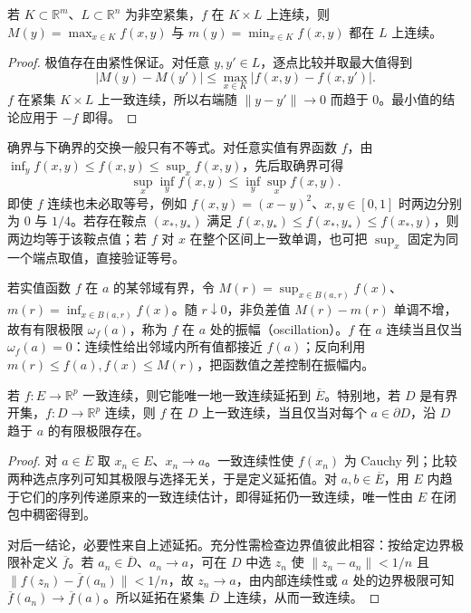 \begin{proposition}
\label{prop:pei-maximum-continuity}
若 $K\subset\mathbb R^m$、$L\subset\mathbb R^n$ 为非空紧集，$f$ 在 $K\times L$ 上连续，则 $M(y)=\max_{x\in K}f(x,y)$ 与 $m(y)=\min_{x\in K}f(x,y)$ 都在 $L$ 上连续。
\end{proposition}
\begin{proof}
极值存在由紧性保证。对任意 $y,y'\in L$，逐点比较并取最大值得到
\[
|M(y)-M(y')|\le\max_{x\in K}|f(x,y)-f(x,y')|.
\]
$f$ 在紧集 $K\times L$ 上一致连续，所以右端随 $\|y-y'\|\to0$ 而趋于 $0$。最小值的结论应用于 $-f$ 即得。
\end{proof}

确界与下确界的交换一般只有不等式。对任意实值有界函数 $f$，由 $\inf_y f(x,y)\le f(x,y)\le\sup_x f(x,y)$，先后取确界可得
\[
\sup_x\inf_y f(x,y)\le\inf_y\sup_x f(x,y).
\]
即使 $f$ 连续也未必取等号，例如 $f(x,y)=(x-y)^2$、$x,y\in[0,1]$ 时两边分别为 $0$ 与 $1/4$。若存在鞍点 $(x_*,y_*)$ 满足 $f(x,y_*)\le f(x_*,y_*)\le f(x_*,y)$，则两边均等于该鞍点值；若 $f$ 对 $x$ 在整个区间上一致单调，也可把 $\sup_x$ 固定为同一个端点取值，直接验证等号。

\begin{remark}
若实值函数 $f$ 在 $a$ 的某邻域有界，令 $M(r)=\sup_{x\in B(a,r)}f(x)$、$m(r)=\inf_{x\in B(a,r)}f(x)$。随 $r\downarrow0$，非负差值 $M(r)-m(r)$ 单调不增，故有有限极限 $\omega_f(a)$，称为 $f$ 在 $a$ 处的振幅（oscillation）。$f$ 在 $a$ 连续当且仅当 $\omega_f(a)=0$：连续性给出邻域内所有值都接近 $f(a)$；反向利用 $m(r)\le f(a),f(x)\le M(r)$，把函数值之差控制在振幅内。
\end{remark}

\begin{theorem}
\label{thm:pei-uniform-extension}
若 $f:E\to\mathbb R^p$ 一致连续，则它能唯一地一致连续延拓到 $\overline E$。特别地，若 $D$ 是有界开集，$f:D\to\mathbb R^p$ 连续，则 $f$ 在 $D$ 上一致连续，当且仅当对每个 $a\in\partial D$，沿 $D$ 趋于 $a$ 的有限极限存在。
\end{theorem}
\begin{proof}
对 $a\in\overline E$ 取 $x_n\in E$、$x_n\to a$。一致连续性使 $f(x_n)$ 为 Cauchy 列；比较两种选点序列可知其极限与选择无关，于是定义延拓值。对 $a,b\in\overline E$，用 $E$ 内趋于它们的序列传递原来的一致连续估计，即得延拓仍一致连续，唯一性由 $E$ 在闭包中稠密得到。

对后一结论，必要性来自上述延拓。充分性需检查边界值彼此相容：按给定边界极限补定义 $\overline f$。若 $a_n\in\overline D$、$a_n\to a$，可在 $D$ 中选 $z_n$ 使 $\|z_n-a_n\|<1/n$ 且 $\|f(z_n)-\overline f(a_n)\|<1/n$，故 $z_n\to a$，由内部连续性或 $a$ 处的边界极限可知 $\overline f(a_n)\to\overline f(a)$。所以延拓在紧集 $\overline D$ 上连续，从而一致连续。
\end{proof}

